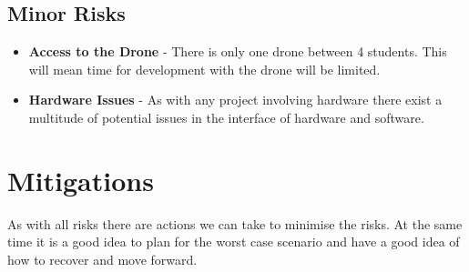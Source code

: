 \documentclass[]{../resources/final_report}
\begin{document}
\subsection{Minor Risks}

\begin{itemize}
  \item \textbf{Access to the Drone} - There is only one drone between 4 students. This will mean time for development with the drone will be limited.
  \item \textbf{Hardware Issues} - As with any project involving hardware there exist a multitude of potential issues in the interface of hardware and software.
\end{itemize}

\pagebreak

\section{Mitigations}

As with all risks there are actions we can take to minimise the risks. At the same time it is a good idea to plan for the worst case scenario and have a good idea of how to recover and move forward.
\end{document}
